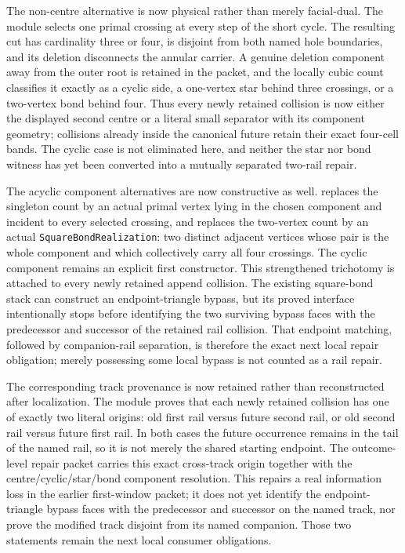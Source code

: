 \documentclass[11pt]{article}
\theoremstyle{definition}
\begin{document}
The non-centre alternative is now physical rather than merely facial-dual.
The module
selects one primal crossing at every step of the short cycle.  The resulting
cut has cardinality three or four, is disjoint from both named hole
boundaries, and its deletion disconnects the annular carrier.  A genuine
deletion component away from the outer root is retained in the packet, and
the locally cubic count classifies it exactly as a cyclic side, a one-vertex
star behind three crossings, or a two-vertex bond behind four.  Thus every
newly retained collision is now either the displayed second centre or a
literal small separator with its component geometry; collisions already
inside the canonical future retain their exact four-cell bands.  The cyclic
case is not eliminated here, and neither the star nor bond witness has yet
been converted into a mutually separated two-rail repair.

The acyclic component alternatives are now constructive as well.
replaces the singleton count by an actual primal vertex lying in the chosen
component and incident to every selected crossing, and replaces the
two-vertex count by an actual \texttt{SquareBondRealization}: two distinct
adjacent vertices whose pair is the whole component and which collectively
carry all four crossings.  The cyclic component remains an explicit first
constructor.  This strengthened trichotomy is attached to every newly
retained append collision.  The existing square-bond stack can construct an
endpoint-triangle bypass, but its proved interface intentionally stops before
identifying the two surviving bypass faces with the predecessor and successor
of the retained rail collision.  That endpoint matching, followed by
companion-rail separation, is therefore the exact next local repair
obligation; merely possessing some local bypass is not counted as a rail
repair.

The corresponding track provenance is now retained rather than reconstructed
after localization.  The module
proves that each newly retained collision has one of exactly two literal
origins: old first rail versus future second rail, or old second rail versus
future first rail.  In both cases the future occurrence remains in the tail of
the named rail, so it is not merely the shared starting endpoint.  The
outcome-level repair packet carries this exact cross-track origin together
with the centre/cyclic/star/bond component resolution.  This repairs a real
information loss in the earlier first-window packet; it does not yet identify
the endpoint-triangle bypass faces with the predecessor and successor on the
named track, nor prove the modified track disjoint from its named companion.
Those two statements remain the next local consumer obligations.
\end{document}

